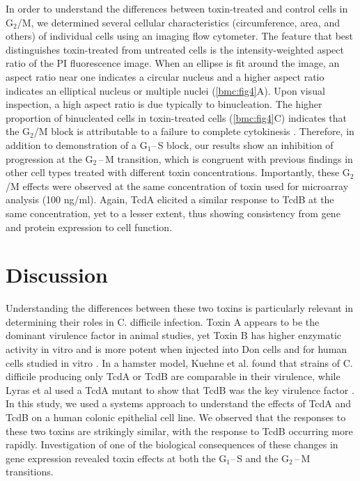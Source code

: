 In order to understand the differences between toxin-treated and control cells in G$_{\text{2}}$/M, we determined  several cellular characteristics (circumference, area, and others) of individual cells using an imaging flow cytometer. The feature that best distinguishes toxin-treated from untreated cells is the intensity-weighted aspect ratio of the PI fluorescence image. When an ellipse is fit around the image, an aspect ratio near one indicates a circular nucleus and a higher aspect ratio indicates an elliptical nucleus or multiple nuclei (\autoref{bmc:fig4}A). Upon visual inspection, a high aspect ratio is due typically to binucleation. The higher proportion of binucleated cells in toxin-treated cells (\autoref{bmc:fig4}C) indicates that the G$_{\text{2}}$/M block is attributable to a failure to complete cytokinesis \cite{Huelsenbeck:2009di}. Therefore, in addition to demonstration of a G$_{\text{1}}$--\,S block, our results show an inhibition of progression at the G$_{\text{2}}$\,--\,M transition, which is congruent with previous findings \cite{Kim:2005jk, Gerhard:2008wz, Nottrott:2007ep, Fiorentini:1998uh} in other cell types treated with different toxin concentrations. Importantly, these G$_{\text{2}}$/M effects were observed at the same concentration of toxin used for microarray analysis (100 ng/ml). Again, TcdA elicited a similar response to TcdB at the same concentration, yet to a lesser extent, thus showing consistency from gene and protein expression to cell function.

\section{Discussion}
Understanding the differences between these two toxins is particularly relevant in determining their roles in C. difficile infection. Toxin A appears to be the dominant virulence factor in animal studies, yet Toxin B has higher enzymatic activity in vitro and is more potent when injected into Don cells and for human cells studied in vitro \cite{ChavesOlarte:1997cs,Riegler:1995jz}. In a hamster model, Kuehne et al. found that strains of C. difficile producing only TcdA or TcdB are comparable in their virulence, while Lyras et al used a TcdA mutant to show that TcdB was the key virulence factor \cite{Kuehne:2010hv,Lyras:2009jx}. In this study, we used a systems approach to understand the effects of TcdA and TcdB on a human colonic epithelial cell line. We observed that the responses to these two toxins are strikingly similar, with the response to TcdB occurring more rapidly. Investigation of one of the biological consequences of these changes in gene expression revealed toxin effects at both the G$_{\text{1}}$--\,S and the G$_{\text{2}}$\,--\,M transitions.

